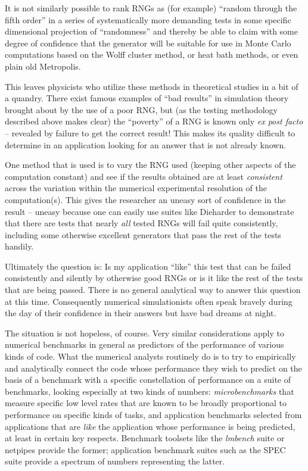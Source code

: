 \documentclass[12pt]{book}
\begin{document}
It is not similarly possible to rank RNGs as (for example) ``random
through the fifth order'' in a series of systematically more demanding
tests in some specific dimensional projection of ``randomness'' and
thereby be able to claim with some degree of confidence that the
generator will be suitable for use in Monte Carlo computations based on
the Wolff cluster method\cite{Wolff}, or heat bath
methods\cite{BinderHeerman}, or even plain old
Metropolis\cite{Metropolis}.  

This leaves physicists who utilize these methods in theoretical studies
in a bit of a quandry.  There exist famous examples of ``bad results''
in simulation theory brought about by the use of a poor RNG, but (as the
testing methodology described above makes clear) the ``poverty'' of a
RNG is known only {\em ex post facto} -- revealed by failure to get the
correct result!  This makes its quality difficult to determine in an
application looking for an answer that is not already known.

One method that is used is to vary the RNG used (keeping other aspects
of the computation constant) and see if the results obtained are at
least {\em consistent} across the variation within the numerical
experimental resolution of the computation(s).  This gives the
researcher an uneasy sort of confidence in the result -- uneasy because
one can easily use suites like Dieharder to demonstrate that there are
tests that nearly {\em all} tested RNGs will fail quite consistently,
including some otherwise excellent generators that pass the rest of the
tests handily.  

Ultimately the question is:  Is my application ``like'' this test that
can be failed consistently and silently by otherwise good RNGs or is it
like the rest of the tests that are being passed.  There is no general
analytical way to answer this question at this time.  Consequently
numerical simulationists often speak bravely during the day of their
confidence in their answers but have bad dreams at night.

The situation is not hopeless, of course.  Very similar considerations
apply to numerical benchmarks in general as predictors of the
performance of various kinds of code.  What the numerical analysts
routinely do is to try to empirically and analytically connect the code
whose performance they wish to predict on the basis of a benchmark with
a specific constellation of performance on a suite of benchmarks,
looking especially at two kinds of numbers:  {\em microbenchmarks} that
measure specific low level rates that are known to be broadly
proportional to performance on specific kinds of tasks, and application
benchmarks selected from applications that are {\em like} the
application whose performance is being predicted, at least in certain
key respects.  Benchmark toolsets like the {\em lmbench}
suite\cite{McVoy} or netpipes\cite{netpipe} provide the former;
application benchmark suites such as the SPEC suite\cite{SPEC} provide a
spectrum of numbers representing the latter.
\end{document}
